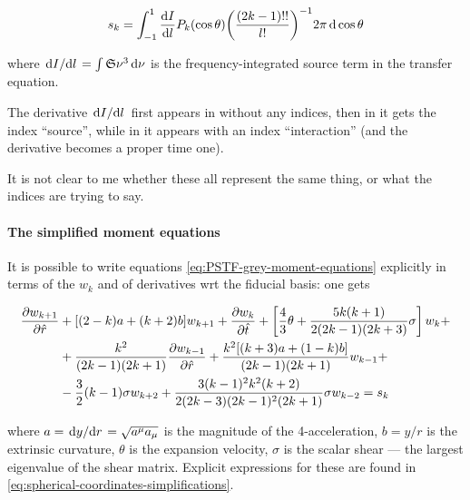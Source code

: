 \documentclass[main.tex]{subfiles}
\begin{document}
\begin{equation}
    s_k = \int_{-1}^1 \dv{I}{l} (\cos \theta) P_k(\cos \theta) \qty(\frac{(2k-1)!!}{l!})^{-1} 2 \pi\dd{\cos \theta}
\end{equation}

where \(\dv*{I}{l} = \int \mathfrak S \nu^3 \dd{\nu}\) is the frequency-integrated  source term in the transfer equation.

\begin{greenbox}
  The derivative \(\dv*{I}{l}\) first appears in \cite[]{Thorne:1981feb} without any indices, then in \cite[section 6]{Thorne:1981feb} it gets the index ``source'', while in \cite[eq. 15]{ThorneFLammmangZytkow:1981feb} it appears with an index ``interaction'' (and the derivative becomes a proper time one).

  It is not clear to me whether these all represent the same thing, or what the indices are trying to say.
\end{greenbox}

\paragraph{The simplified moment equations}

It is possible to write equations \eqref{eq:PSTF-grey-moment-equations} explicitly in terms of the \(w_k\) and of derivatives wrt the fiducial basis: one gets \cite[eq. 5.10c]{Thorne:1981feb}

\begin{equation} \label{eq:scalar-PSTF-moment-equations}
  \begin{split}
    \pdv{w_{k+1}}{\hat{r}} &+[(2-k) a+(k+2) b] w_{k+1}+\pdv{w_k}{\hat{t}}+\left[\frac{4}{3} \theta+\frac{5 k(k+1)}{2(2 k-1)(2 k+3)} \sigma\right] w_{k} + \\
    &+\frac{k^{2}}{(2 k-1)(2 k+1)} \pdv{w_{k-1}}{\hat{r}}+\frac{k^{2}[(k+3) a+(1-k) b]}{(2 k-1)(2 k+1)} w_{k-1} +  \\
    &-\frac{3}{2}(k-1) \sigma w_{k+2}+\frac{3(k-1)^{2} k^{2}(k+2)}{2(2 k-3)(2 k-1)^{2}(2 k+1)} \sigma w_{k-2} = s_k
    \end{split}
\end{equation}

where \(a = \dv*{y}{r} = \sqrt{a^\mu a_\mu}\) is the magnitude of the 4-acceleration, \(b = y/r\) is the extrinsic curvature, \(\theta\) is the expansion velocity, \(\sigma\) is the scalar shear --- the largest eigenvalue of the shear matrix. Explicit expressions for these are found in  \eqref{eq:spherical-coordinates-simplifications}.
\end{document}
